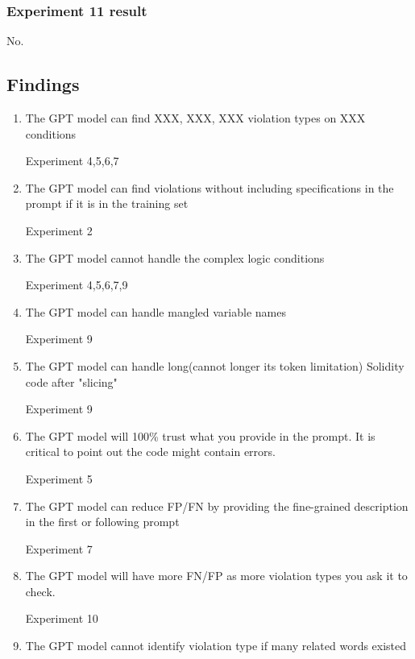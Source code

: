 \subsubsection{ Experiment 11 result }
No.


\subsection{ Findings }

\begin{enumerate}

    \item The GPT model can find XXX, XXX, XXX violation types on XXX conditions

    Experiment 4,5,6,7
    
    \item The GPT model can find violations without including specifications in the prompt if it is in the training set

    Experiment 2
    
    \item The GPT model cannot handle the complex logic conditions

    Experiment 4,5,6,7,9
    
    \item The GPT model can handle mangled variable names

    Experiment 9
    
    \item The GPT model can handle long(cannot longer its token limitation) Solidity code after "slicing"

    Experiment 9

    \item The GPT model will 100\% trust what you provide in the prompt. It is critical to point out the code might contain errors.

    Experiment 5
    
    \item The GPT model can reduce FP/FN by providing the fine-grained description in the first or following prompt

    Experiment 7
    
    \item The GPT model will have more FN/FP as more violation types you ask it to check.

    Experiment 10

    \item The GPT model cannot identify violation type if many related  words existed
     
    
\end{enumerate}

\fi






